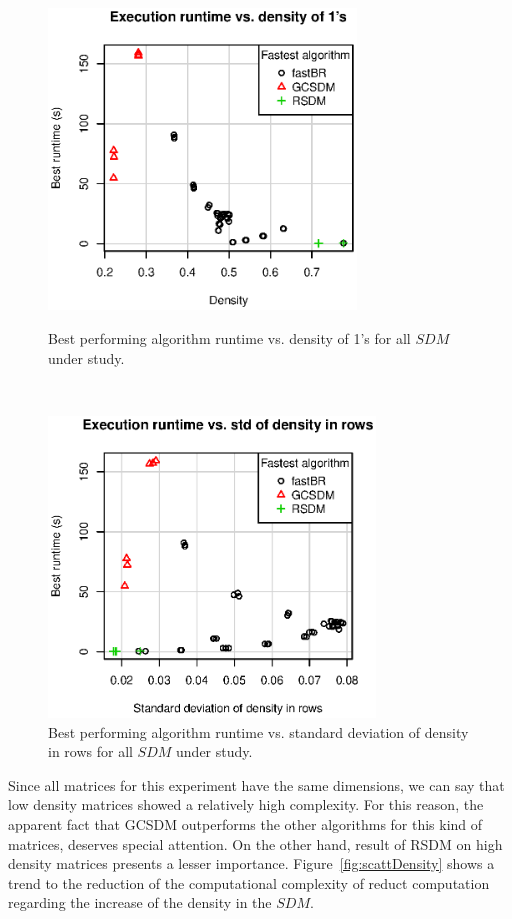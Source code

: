 \documentclass[authoryear,11pt]{elsarticle}
\begin{document}
	\begin{figure}[htb]
	\begin{minipage}{.48\textwidth}
	    \begin{center}
	       \includegraphics[height=8cm]{scatter_density.eps}
	    \end{center}
	\caption{Best performing algorithm runtime vs. density of 1's for all $SDM$ under study.}
	\label{fig:scattDensity}
	\end{minipage}%
	~
	\begin{minipage}{.48\textwidth}
	    \begin{center}
	       \includegraphics[height=8cm]{scatter_std.eps}
	    \end{center}
	\caption{Best performing algorithm runtime vs. standard deviation of density in rows for 
			 all $SDM$ under study.}
	\label{fig:scattStd}
	\end{minipage}	
	\end{figure}	
	
	Since all matrices for this experiment have the same dimensions, we can say that low density
	matrices showed a relatively high complexity. For this reason, the apparent fact that GCSDM outperforms 
	the other algorithms for this kind of matrices, deserves special attention. On the other hand, result 
	of RSDM on high density matrices presents a lesser importance. Figure~\ref{fig:scattDensity} shows a trend
	to the reduction of the computational complexity of reduct computation regarding the increase of the
	density in the $SDM$.
	
\end{document}
